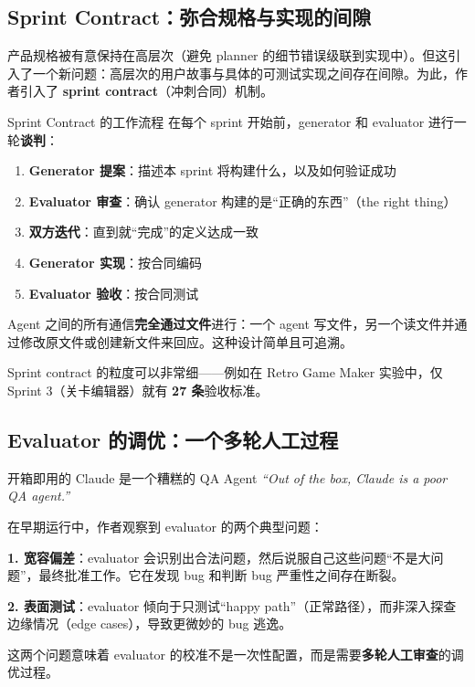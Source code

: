 \subsection{Sprint Contract：弥合规格与实现的间隙}

产品规格被有意保持在高层次（避免 planner 的细节错误级联到实现中）。但这引入了一个新问题：高层次的用户故事与具体的可测试实现之间存在间隙。为此，作者引入了 \textbf{sprint contract}（冲刺合同）机制。

\begin{knowledgebox}{Sprint Contract 的工作流程}
在每个 sprint 开始前，generator 和 evaluator 进行一轮\textbf{谈判}：

\begin{enumerate}[leftmargin=1.5em]
    \item \textbf{Generator 提案}：描述本 sprint 将构建什么，以及如何验证成功
    \item \textbf{Evaluator 审查}：确认 generator 构建的是``正确的东西''（the right thing）
    \item \textbf{双方迭代}：直到就``完成''的定义达成一致
    \item \textbf{Generator 实现}：按合同编码
    \item \textbf{Evaluator 验收}：按合同测试
\end{enumerate}

Agent 之间的所有通信\textbf{完全通过文件}进行：一个 agent 写文件，另一个读文件并通过修改原文件或创建新文件来回应。这种设计简单且可追溯。
\end{knowledgebox}

Sprint contract 的粒度可以非常细——例如在 Retro Game Maker 实验中，仅 Sprint 3（关卡编辑器）就有 \textbf{27 条}验收标准。

\subsection{Evaluator 的调优：一个多轮人工过程}

\begin{warningbox}{开箱即用的 Claude 是一个糟糕的 QA Agent}
\textit{``Out of the box, Claude is a poor QA agent.''}

在早期运行中，作者观察到 evaluator 的两个典型问题：

\textbf{1. 宽容偏差}：evaluator 会识别出合法问题，然后说服自己这些问题``不是大问题''，最终批准工作。它在发现 bug 和判断 bug 严重性之间存在断裂。

\textbf{2. 表面测试}：evaluator 倾向于只测试``happy path''（正常路径），而非深入探查边缘情况（edge cases），导致更微妙的 bug 逃逸。

这两个问题意味着 evaluator 的校准不是一次性配置，而是需要\textbf{多轮人工审查}的调优过程。
\end{warningbox}

